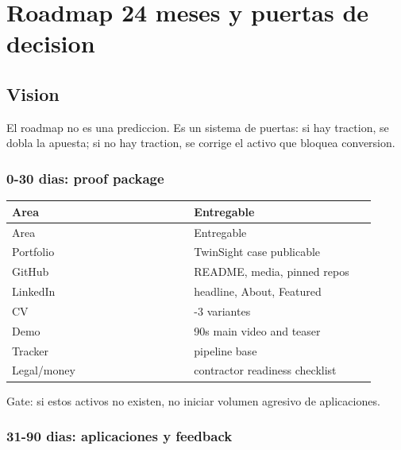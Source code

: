 \chapter{Roadmap 24 meses y puertas de decision}

\section{Vision}


El roadmap no es una prediccion. Es un sistema de puertas: si hay traction, se dobla la apuesta; si no hay traction, se corrige el activo que bloquea conversion.


\subsection{0-30 dias: proof package}


\begin{center}
\scriptsize
\begin{longtable}{>{\raggedright\arraybackslash}p{0.455\linewidth} >{\raggedright\arraybackslash}p{0.455\linewidth}}
\toprule
Area & Entregable \\
\midrule
\endfirsthead
\toprule
Area & Entregable \\
\midrule
\endhead
Portfolio & TwinSight case publicable \\
GitHub & README, media, pinned repos \\
LinkedIn & headline, About, Featured \\
CV & 2-3 variantes \\
Demo & 90s main video and teaser \\
Tracker & pipeline base \\
Legal/money & contractor readiness checklist \\
\bottomrule
\end{longtable}
\end{center}


Gate: si estos activos no existen, no iniciar volumen agresivo de aplicaciones.


\subsection{31-90 dias: aplicaciones y feedback}



